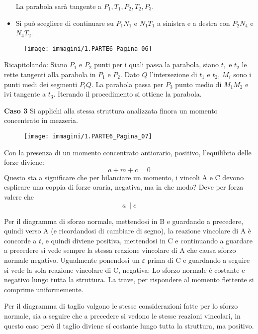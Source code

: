 \documentclass{article}
\begin{document}
\begin{adjustwidth}{2in}{}
\begin{itemize}
La parabola sarà tangente a $P_1, T_1, P_2,T_2, P_3$. 

\item Si può scegliere di continuare su $P_1N_1$ e $N_1T_1$ a sinistra e a destra con $P_2N_4$ e $ N_4T_2 $.
\end{itemize}
\begin{figure}[H]
	\centering
	\texttt{[image: immagini/1.PARTE6\_Pagina\_06]}
\end{figure}
	Ricapitolando: Siano $ P_1 $ e $ P_2  $ punti per i quali passa la parabola, siano $ t_1 $ e $ t_2 $ le rette tangenti alla parabola in $ P_1 $ e
	$ P_2 $.
	Dato $ Q $ l’intersezione di $ t_1 $ e $ t_2 $, $ M_i $ sono i punti medi dei segmenti $ P_i Q $.
	La parabola passa per $ P_3 $ punto medio di $ M_1 M_2 $ e ivi tangente a $ t_3 $.
	Iterando il procedimento si ottiene la parabola. \newline
	\newpage
	
\textbf{Caso 3}
Si applichi alla stessa struttura analizzata finora un momento concentrato in mezzeria.
 \begin{figure}[H]
	\centering
	\texttt{[image: immagini/1.PARTE6\_Pagina\_07]}
\end{figure}
	Con la presenza di un momento concentrato antiorario, positivo, l'equilibrio delle forze diviene: 	
\[a + m +c =0\]
	Questo sta a significare che per bilanciare un momento, i vincoli A e C devono esplicare una coppia di forze oraria, negativa, ma in che modo? Deve per forza valere che
 \[a \parallel c\] 
 
 
 Per il diagramma di sforzo normale, mettendosi in B e guardando a precedere, quindi verso A (e ricordandosi di cambiare di segno), la reazione vincolare di A è concorde a $t$, e quindi diviene positiva, mettendosi in C e continuando a guardare a precedere si vede sempre la stessa reazione vincolare di A che causa sforzo normale negativo. Ugualmente ponendosi un $\varepsilon$ prima di C e guardando a seguire si vede la sola reazione vincolare di C, negativa: Lo sforzo normale è costante e negativo lungo tutta la struttura. La trave, per rispondere al momento flettente si comprime uniformemente. \newline 
 
 Per il diagramma di taglio valgono le stesse considerazioni fatte per lo sforzo normale, sia a seguire che a precedere si vedono le stesse reazioni vincolari, in questo caso però il taglio diviene sí costante lungo tutta la struttura, ma positivo. \newline 
 

\end{adjustwidth}
\end{document}
